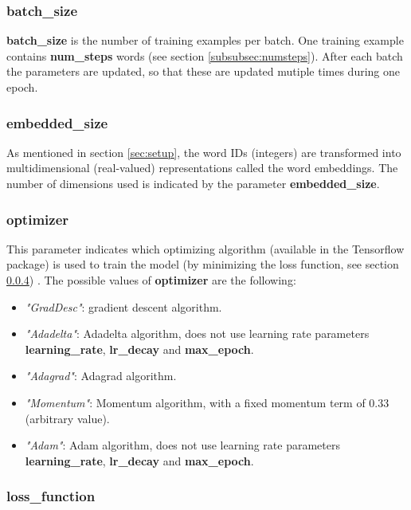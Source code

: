 \documentclass[10pt,a4paper,titlepage]{article}
\begin{document}
\subsubsection{batch\_size}

\textbf{batch\_size} is the number of training examples per batch. One training example contains \textbf{num\_steps} words (see section \ref{subsubsec:numsteps}). After each batch the parameters are updated, so that these are updated mutiple times during one epoch.

\subsubsection{embedded\_size}

As mentioned in section \ref{sec:setup}, the word IDs (integers) are transformed into multidimensional (real-valued) representations called the word embeddings. The number of dimensions used is indicated by the parameter \textbf{embedded\_size}.

\subsubsection{optimizer}
\label{subsubsec:opt}

This parameter indicates which optimizing algorithm (available in the Tensorflow package) is used to train the model (by minimizing the loss function, see section \ref{subsubsec:loss}) \cite{opt}. The possible values of \textbf{optimizer} are the following:

\begin{itemize}

	\item \textit{"GradDesc"}: gradient descent algorithm.
	\item \textit{"Adadelta"}: Adadelta algorithm, does not use learning rate parameters \textbf{learning\_rate}, \textbf{lr\_decay} and \textbf{max\_epoch}.
	\item \textit{"Adagrad"}: Adagrad algorithm.
	\item \textit{"Momentum"}: Momentum algorithm, with a fixed momentum term of 0.33 (arbitrary value).
	\item \textit{"Adam"}: Adam algorithm, does not use learning rate parameters \textbf{learning\_rate}, \textbf{lr\_decay} and \textbf{max\_epoch}.	

\end{itemize}

\subsubsection{loss\_function}
\label{subsubsec:loss}
\end{document}
